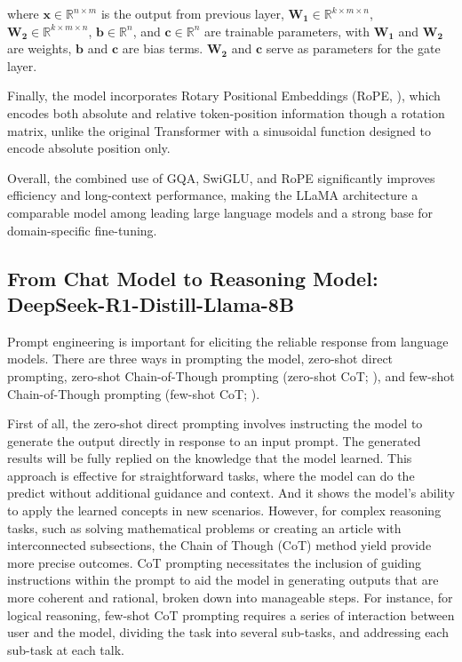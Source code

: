 where $\mathbf{x} \in \mathbb{R}^{n \times m}$ is the output from previous layer, $\mathbf{W_1} \in \mathbb{R}^{k \times m \times n}$, $\mathbf{W_2} \in \mathbb{R}^{k \times m \times n}$, $\mathbf{b} \in \mathbb{R}^{n}$, and $\mathbf{c} \in \mathbb{R}^{n}$ are trainable parameters, with $\mathbf{W_1}$ and $\mathbf{W_2}$ are weights, $\mathbf{b}$ and $\mathbf{c}$ are bias terms. $\mathbf{W_2}$ and $\mathbf{c}$ serve as parameters for the gate layer.






Finally, the model incorporates Rotary Positional Embeddings (RoPE, \cite{su2024roformer}), which encodes both absolute and relative token-position information though a rotation matrix, unlike the original Transformer with a sinusoidal function designed to encode absolute position only.


Overall, the combined use of GQA, SwiGLU, and RoPE significantly improves efficiency and long-context performance, making the LLaMA architecture a comparable model among leading large language models and a strong base for domain-specific fine-tuning.


\subsection*{From Chat Model to Reasoning Model: DeepSeek-R1-Distill-Llama-8B}


Prompt engineering is important for eliciting the reliable response from language models. There are three ways in prompting the model, zero-shot direct prompting, zero-shot Chain-of-Though prompting (zero-shot CoT; \cite{kojima2022large}), and few-shot Chain-of-Though prompting (few-shot CoT; \cite{wei2022chain}).

%
First of all, the zero-shot direct prompting involves instructing the model to generate the output directly in response to an input prompt. The generated results will be fully replied on the knowledge that the model learned. This approach is effective for straightforward tasks, where the model can do the predict without additional guidance and context. And it shows the model's ability to apply the learned concepts in new scenarios. However, for complex reasoning tasks, such as solving mathematical problems or creating an article with interconnected subsections, the Chain of Though (CoT) method yield provide more precise outcomes. CoT prompting necessitates the inclusion of guiding instructions within the prompt to aid the model in generating outputs that are more coherent and rational, broken down into manageable steps. For instance, for logical reasoning, few-shot CoT prompting requires a series of interaction between user and the model, dividing the task into several sub-tasks, and addressing each sub-task at each talk.


